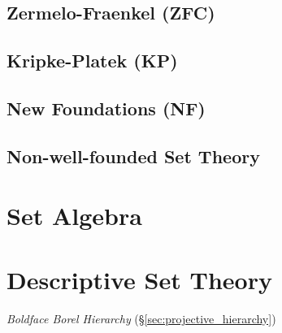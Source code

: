 \subsection{Zermelo-Fraenkel (ZFC)}\label{sec:zermelo_fraenkel}


\subsection{Kripke-Platek (KP)}\label{sec:kripke_platek}

\subsection{New Foundations (NF)}\label{sec:quine_foundations}

\subsection{Non-well-founded Set Theory}\label{sec:non_wellfounded}



\section{Set Algebra}\label{sec:set_algebra}

\section{Descriptive Set Theory}\label{sec:descriptive_set_theory}

\emph{Boldface Borel Hierarchy} (\S\ref{sec:projective_hierarchy})

